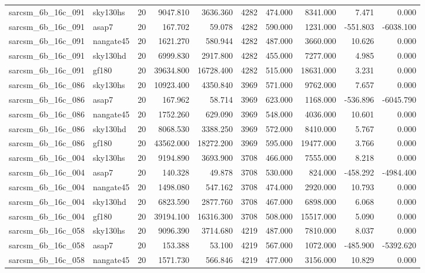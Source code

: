 \documentclass{article}
\begin{document}
\begin{longtable}{llrrrrrrrr}
sarcsm\_6b\_16c\_091 & sky130hs & 20 & 9047.810 & 3636.360 & 4282 & 474.000 & 8341.000 & 7.471 & 0.000 \\
sarcsm\_6b\_16c\_091 & asap7 & 20 & 167.702 & 59.078 & 4282 & 590.000 & 1231.000 & -551.803 & -6038.100 \\
sarcsm\_6b\_16c\_091 & nangate45 & 20 & 1621.270 & 580.944 & 4282 & 487.000 & 3660.000 & 10.626 & 0.000 \\
sarcsm\_6b\_16c\_091 & sky130hd & 20 & 6999.830 & 2917.800 & 4282 & 455.000 & 7277.000 & 4.985 & 0.000 \\
sarcsm\_6b\_16c\_091 & gf180 & 20 & 39634.800 & 16728.400 & 4282 & 515.000 & 18631.000 & 3.231 & 0.000 \\
sarcsm\_6b\_16c\_086 & sky130hs & 20 & 10923.400 & 4350.840 & 3969 & 571.000 & 9762.000 & 7.657 & 0.000 \\
sarcsm\_6b\_16c\_086 & asap7 & 20 & 167.962 & 58.714 & 3969 & 623.000 & 1168.000 & -536.896 & -6045.790 \\
sarcsm\_6b\_16c\_086 & nangate45 & 20 & 1752.260 & 629.090 & 3969 & 548.000 & 4036.000 & 10.601 & 0.000 \\
sarcsm\_6b\_16c\_086 & sky130hd & 20 & 8068.530 & 3388.250 & 3969 & 572.000 & 8410.000 & 5.767 & 0.000 \\
sarcsm\_6b\_16c\_086 & gf180 & 20 & 43562.000 & 18272.200 & 3969 & 595.000 & 19477.000 & 3.766 & 0.000 \\
sarcsm\_6b\_16c\_004 & sky130hs & 20 & 9194.890 & 3693.900 & 3708 & 466.000 & 7555.000 & 8.218 & 0.000 \\
sarcsm\_6b\_16c\_004 & asap7 & 20 & 140.328 & 49.878 & 3708 & 530.000 & 824.000 & -458.292 & -4984.400 \\
sarcsm\_6b\_16c\_004 & nangate45 & 20 & 1498.080 & 547.162 & 3708 & 474.000 & 2920.000 & 10.793 & 0.000 \\
sarcsm\_6b\_16c\_004 & sky130hd & 20 & 6823.590 & 2877.760 & 3708 & 467.000 & 6898.000 & 6.068 & 0.000 \\
sarcsm\_6b\_16c\_004 & gf180 & 20 & 39194.100 & 16316.300 & 3708 & 508.000 & 15517.000 & 5.090 & 0.000 \\
sarcsm\_6b\_16c\_058 & sky130hs & 20 & 9096.390 & 3714.680 & 4219 & 487.000 & 7810.000 & 8.037 & 0.000 \\
sarcsm\_6b\_16c\_058 & asap7 & 20 & 153.388 & 53.100 & 4219 & 567.000 & 1072.000 & -485.900 & -5392.620 \\
sarcsm\_6b\_16c\_058 & nangate45 & 20 & 1571.730 & 566.846 & 4219 & 477.000 & 3156.000 & 10.829 & 0.000 \\

\end{longtable}
\end{document}
